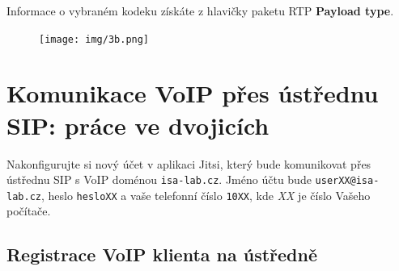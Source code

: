 \noindent Informace o vybraném kodeku získáte z hlavičky paketu RTP {\bf Payload type}.
\begin{figure}[h!]
  \centering
  \texttt{[image: img/3b.png]}
\end{figure}


\section{Komunikace VoIP přes ústřednu SIP: práce ve dvojicích}
Nakonfigurujte si nový účet v aplikaci Jitsi, který bude komunikovat přes ústřednu SIP s VoIP doménou {\tt isa-lab.cz}. Jméno účtu bude {\tt userXX@isa-lab.cz}, heslo {\tt hesloXX} a vaše telefonní číslo {\tt 10XX}, kde {\it XX} je číslo Vašeho počítače. 

\subsection{Registrace VoIP klienta na ústředně}
